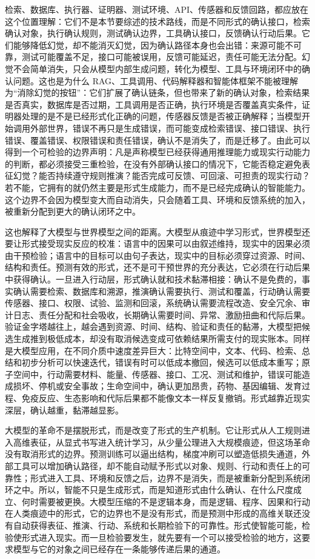检索、数据库、执行器、证明器、测试环境、API、传感器和反馈回路，都应放在这个位置理解：它们不是本节要综述的技术路线，而是不同形式的确认接口，检索确认对象，执行确认规则，测试确认边界，工具确认接口，反馈确认行动后果。它们能够降低幻觉，却不能消灭幻觉，因为确认路径本身也会出错：来源可能不可靠，测试可能覆盖不足，接口可能被误用，反馈可能延迟，责任可能无法分配。幻觉不会简单消失，只会从模型内部生成问题，转化为模型、工具与环境闭环中的确认问题。这也是为什么 RAG、工具调用、代码解释器和智能体框架不能被理解为“消除幻觉的按钮”：它们扩展了确认链条，但也带来了新的确认对象，检索结果是否真实，数据库是否过期，工具调用是否正确，执行环境是否覆盖真实条件，证明器处理的是不是已经形式化正确的问题，传感器反馈是否被正确解释；当模型开始调用外部世界，错误不再只是生成错误，而可能变成检索错误、接口错误、执行错误、覆盖错误、权限错误和责任错误，确认不是消失了，而是迁移了。由此可以得到一个可检验的边界声明：凡是声称模型已经获得通用推理能力或现实行动能力的判断，都必须接受三重检验，在没有外部确认接口的情况下，它能否稳定避免表征幻觉？能否持续遵守规则推演？能否完成可反馈、可回滚、可担责的现实行动？若不能，它拥有的就仍然主要是形式生成能力，而不是已经完成确认的智能能力。这个边界不会因为模型变大而自动消失，只会随着工具、环境和反馈系统的加入，被重新分配到更大的确认闭环之中。

这也解释了大模型与世界模型之间的距离。大模型从痕迹中学习形式，世界模型还要让形式接受现实反应的校准：语言中的因果可以由叙述维持，现实中的因果必须由干预检验；语言中的目标可以由句子表达，现实中的目标必须穿过资源、时间、结构和责任。预测有效的形式，还不是可干预世界的充分表达，它必须在行动后果中获得确认。一旦进入行动层，形式确认就和技术黏滞相接：确认不是免费的，事实确认需要检索、数据库和溯源，推演确认需要执行、测试和覆盖，行动确认需要传感器、接口、权限、试验、监测和回滚，系统确认需要流程改造、安全冗余、审计日志、责任分配和社会吸收，长期确认需要时间、异常、激励扭曲和代际后果。验证金字塔越往上，越会遇到资源、时间、结构、验证和责任的黏滞，大模型把候选生成推到极低成本，却没有取消候选变成可依赖结果所需支付的现实账本。同样是大模型应用，在不同介质中速度差异巨大：比特空间中，文本、代码、检索、总结和初步分析可以快速迭代，错误有时可以低成本撤回，候选可以低成本重写；原子空间中，行动需要材料、能量、传感器、接口、工况、测试和维护，错误可能造成损坏、停机或安全事故；生命空间中，确认更加昂贵，药物、基因编辑、发育过程、免疫反应、生态影响和代际后果都不能像文本一样反复撤销。形式越靠近现实深层，确认越重，黏滞越显影。

大模型的革命不是摆脱形式，而是改变了形式的生产机制。它让形式从人工规则进入高维表征，从显式书写进入统计学习，从少量公理进入大规模痕迹，但这场革命没有取消形式的边界。预测训练可以逼出结构，梯度冲刷可以塑造低损失通道，外部工具可以增加确认路径，却不能自动赋予形式以对象、规则、行动和责任上的可靠性；形式进入工具、环境和反馈之后，边界不是消失，而是被重新分配到系统闭环之中。所以，智能不只是生成形式，而是知道形式由什么确认、在什么尺度成立、何时需要被更换。大模型压缩的不是逻辑本身，而是逻辑、程序、因果和行动在人类痕迹中的形式，它的边界也不是没有形式，而是预测中形成的高维关联还没有自动获得表征、推演、行动、系统和长期检验下的可靠性。形式使智能可能，检验使形式进入现实。而一旦检验要发生，就先要有一个可以接受检验的地方，这要求模型与它的对象之间已经存在一条能够传递后果的通道。
